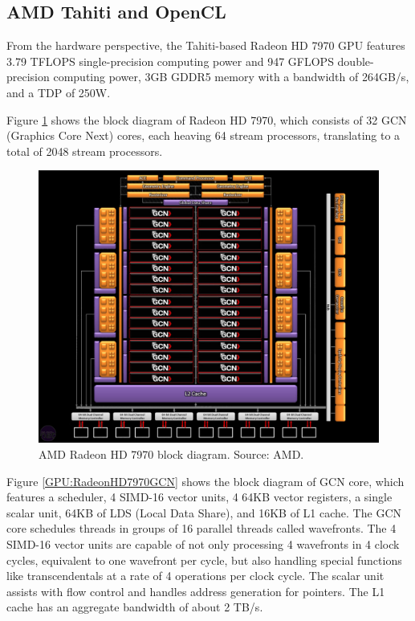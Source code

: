 \subsection{AMD Tahiti and OpenCL}

From the hardware perspective, the Tahiti-based Radeon HD 7970 GPU features 3.79 TFLOPS single-precision computing power and 947 GFLOPS double-precision computing power, 3GB GDDR5 memory with a bandwidth of 264GB/s, and a TDP of 250W.

Figure \ref{GPU:RadeonHD7970BlockDiagram} shows the block diagram of Radeon HD 7970, which consists of 32 GCN (Graphics Core Next) cores, each heaving 64 stream processors, translating to a total of 2048 stream processors.

\begin{figure}[t]
\centering
\includegraphics[width=\textwidth]{GPU/RadeonHD7970BlockDiagram.jpg}
\caption{AMD Radeon HD 7970 block diagram. Source: AMD.}
\label{GPU:RadeonHD7970BlockDiagram}
\end{figure}

Figure \ref{GPU:RadeonHD7970GCN} shows the block diagram of GCN core, which features a scheduler, 4 SIMD-16 vector units, 4 64KB vector registers, a single scalar unit, 64KB of LDS (Local Data Share), and 16KB of L1 cache. The GCN core schedules threads in groups of 16 parallel threads called wavefronts. The 4 SIMD-16 vector units are capable of not only processing 4 wavefronts in 4 clock cycles, equivalent to one wavefront per cycle, but also handling special functions like transcendentals at a rate of 4 operations per clock cycle. The scalar unit assists with flow control and handles address generation for pointers. The L1 cache has an aggregate bandwidth of about 2 TB/s.


